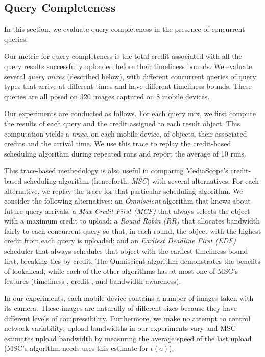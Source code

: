 
\subsection{Query Completeness}
\label{sec-4-2}

In this section, we evaluate query completeness in the presence of
concurrent queries.

%
Our metric for query completeness is the total credit associated with
all the query results successfully uploaded before their timeliness
bounds.
%
We evaluate several \emph{query mixes} (described below), with
different concurrent queries of query types that arrive at different
times and have different timeliness bounds.
%
These queries are all posed on 320 images captured on 8
mobile devices.
%

Our experiments are conducted as follows.
%
For each query mix, we first compute the results of each query and the
credit assigned to each result object.
%
This computation yields a \emph{trace}, on each mobile device, of
objects, their associated credits and the arrival time.
%
We use this trace to replay the credit-based scheduling algorithm
during repeated runs and report the average of 10 runs.

This trace-based methodology is also useful in comparing MediaScope's
credit-based scheduling algorithm (henceforth, \emph{MSC}) with
several alternatives.
%
For each alternative, we replay the trace for that particular
scheduling algorithm.
%
We consider the following alternatives: an \emph{Omniscient} algorithm
that knows about future query arrivals; a \emph{Max Credit First
  (MCF)} that always selects the object with a maximum credit to
upload; a \emph{Round Robin (RR)} that allocates bandwidth fairly to
each concurrent query so that, in each round, the object with the
highest credit from each query is uploaded; and an \emph{Earliest
  Deadline First (EDF)} scheduler that always schedules that object
with the earliest timeliness bound first, breaking ties by credit.
%
The Omniscient algorithm demonstrates the benefits of lookahead, while
each of the other algorithms has at most one of MSC's features
(timeliness-, credit-, and bandwidth-awareness).

In our experiments,  each mobile device contains a number of images
taken with its camera.
%
These images are naturally of different sizes because they have
different levels of compressibility.
%
Furthermore, we make no attempt to control network variability; upload
bandwidths in our experiments vary and MSC estimates upload bandwidth
by measuring the average speed of the last upload (MSC's algorithm
needs uses this estimate for $t(o)$).

